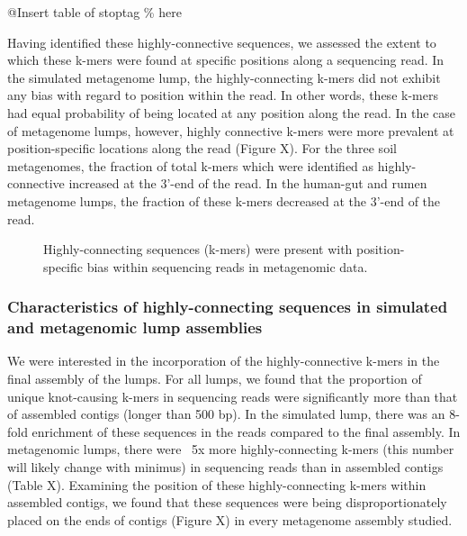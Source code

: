 \documentclass[11pt]{article} %
\begin{document}
@Insert table of stoptag \% here

Having identified these highly-connective sequences, we assessed the extent to which these k-mers were found at specific positions along a sequencing read.  In the simulated metagenome lump, the highly-connecting k-mers did not exhibit any bias with regard to position within the read.  In other words, these k-mers had equal probability of being located at any position along the read.  In the case of metagenome lumps, however, highly connective k-mers were more prevalent at position-specific locations along the read (Figure X).   For the three soil metagenomes, the fraction of total k-mers which were identified as highly-connective increased at the 3'-end of the read.  In the human-gut and rumen metagenome lumps, the fraction of these k-mers decreased at the 3'-end of the read.    

\begin{figure}
\caption{Highly-connecting sequences (k-mers) were present with position-specific bias within sequencing reads in metagenomic data.}
\end{figure}


\subsubsection{Characteristics of highly-connecting sequences in simulated and metagenomic lump assemblies}

We were interested in the incorporation of the highly-connective k-mers in the final assembly of the lumps.  For all lumps, we found that the proportion of unique knot-causing k-mers in sequencing reads were significantly more than that of assembled contigs (longer than 500 bp).  In the simulated lump, there was an 8-fold enrichment of these sequences in the reads compared to the final assembly.  In metagenomic lumps, there were ~5x more highly-connecting k-mers (this number will likely change with minimus) in sequencing reads than in assembled contigs (Table X).  Examining the position of these highly-connecting k-mers within assembled contigs, we found that these sequences were being disproportionately placed on the ends of contigs (Figure X) in every metagenome assembly studied.  
\end{document}
